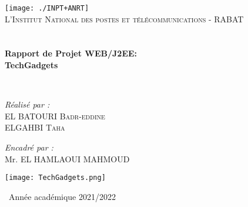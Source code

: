 \begin{titlepage}
\begin{center}

\texttt{[image: ./INPT+ANRT]}~\\[1.5cm]

\textsc{\Large L'Institut National des postes et télécommunications - RABAT }\\[2.5cm]

\textsc{\Large }\\[0.4cm]

\HRule \\[0.3cm]

{\huge \bfseries Rapport de Projet WEB/J2EE:\\
TechGadgets\\[0.3cm] }

\HRule \\[3cm]

\begin{minipage}{0.4\textwidth}
\begin{flushleft} \large
\emph{Réalisé par :}\\[0.5 cm]
EL BATOURI  \textsc{ Badr-eddine}\\
ELGAHBI  \textsc{ Taha}\\

\end{flushleft}
\end{minipage}
\begin{minipage}{0.4\textwidth}
\begin{flushright} \large
\emph{Encadré par :} \\[0.5 cm]
Mr. EL HAMLAOUI \textsc{MAHMOUD}\\

\end{flushright}
\end{minipage}

\begin{center}
\texttt{[image: TechGadgets.png]}    
\end{center}


\vfill


{\large \ Année académique 2021/2022}

\end{center}
\end{titlepage}